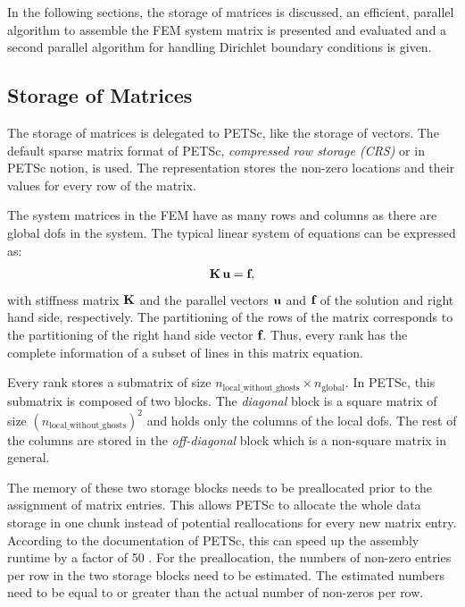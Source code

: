 In the following sections, the storage of matrices is discussed, an efficient, parallel algorithm to assemble the FEM system matrix is presented and evaluated and a second parallel algorithm for handling Dirichlet boundary conditions is given.

\subsection{Storage of Matrices}
The storage of matrices is delegated to PETSc, like the storage of vectors. The default sparse  matrix format of PETSc, \emph{compressed row storage (CRS)} or  in PETSc notion, is used. 
The representation stores the non-zero locations and their values for every row of the matrix.

The system matrices in the FEM have as many rows and columns as there are global dofs in the system. The typical linear system of equations can be expressed as:
\begin{align*}
  \textbf{K}\,\textbf{u} = \textbf{f},
\end{align*}
with stiffness matrix $\textbf{K}$ and the parallel vectors $\textbf{u}$ and $\textbf{f}$ of the solution and right hand side, respectively. The partitioning of the rows of the matrix corresponds to the partitioning of the right hand side vector $\textbf{f}$. Thus, every rank has the complete information of a subset of lines in this matrix equation.

Every rank stores a submatrix of size $n_\text{local\_without\_ghosts} \times n_\text{global}$. In PETSc, this submatrix is composed of two blocks. The \emph{diagonal} block is a square matrix of size $(n_\text{local\_without\_ghosts})^2$ and holds only the columns of the local dofs. The rest of the columns are stored in the \emph{off-diagonal} block which is a non-square matrix in general.

The memory of these two storage blocks needs to be preallocated prior to the assignment of matrix entries. This allows PETSc to allocate the whole data storage in one chunk instead of potential reallocations for every new matrix entry. According to the documentation of PETSc, this can speed up the assembly runtime by a factor of 50 \cite{petsc-web-page}. For the preallocation, the numbers of non-zero entries per row in the two storage blocks need to be estimated. The estimated numbers need to be equal to or greater than the actual number of non-zeros per row.

